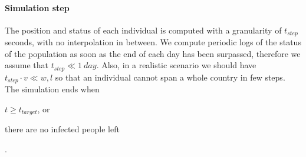 \paragraph{Simulation step}
The position and status of each individual is computed with a granularity of $t_{step}$ seconds, with no interpolation in between.
We compute periodic logs of the status of the population as soon as the end of each day has been surpassed, therefore we assume that $t_{step} \ll \SI{1}{day}$. Also, in a realistic scenario we should have $t_{step} \cdot v \ll w,l$ so that an individual cannot span a whole country in few steps.
The simulation ends when
\begin{enumerate*}[label=(\roman*)]
    \item $t \geq t_{target}$, or
    \item there are no infected people left
\end{enumerate*}.